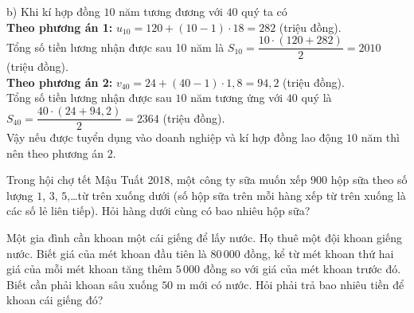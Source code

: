 \begin{ex}
{		b) Khi kí hợp đồng $10$ năm tương  đương với $40$ quý ta có\\
		\textbf{Theo phương án 1:} $u_{10} = 120 + (10 - 1)\cdot 18 = 282$ (triệu  đồng).\\
		Tổng số tiền lương nhận được sau 10 năm là $S_{10} = \dfrac{10\cdot (120+282)}{2}  = 2010$ (triệu đồng).\\
		\textbf{Theo phương án 2:}  $v_{40} = 24 + (40-1)\cdot 1{,}8 = 94{,}2$ (triệu đồng).\\
		Tổng  số tiền lương nhận được sau $10$ năm tương ứng với $40$ quý là $S_{40} = \dfrac{40\cdot (24+94{,}2)}{2} = 2364$ (triệu đồng).\\
		Vậy nếu được tuyển dụng vào doanh nghiệp và kí hợp đồng lao động $10$ năm thì nên theo phương án $2$. 
	 }
\end{ex}

\begin{ex}%
	Trong hội chợ tết Mậu Tuất 2018, một công ty sữa muốn  xếp $900$ hộp sữa theo số lượng $1$, $3$, $5$,\ldots từ trên xuống dưới (số hộp sữa trên mỗi hàng xếp từ trên xuống là các số lẻ liên tiếp). Hỏi hàng dưới cùng có bao nhiêu hộp sữa?
\end{ex}

\begin{ex}%
	Một gia đình cần khoan một cái giếng để lấy nước. Họ thuê một đội khoan giếng nước. Biết giá của mét khoan đầu tiên là $80\,000$  đồng, kể từ mét khoan thứ hai giá của mỗi mét khoan tăng thêm $5\,000$ đồng so với giá của mét khoan trước đó. Biết cần phải khoan sâu xuống $50$ m mới có nước. Hỏi phải trả bao nhiêu tiền để khoan cái giếng đó?
\end{ex}

